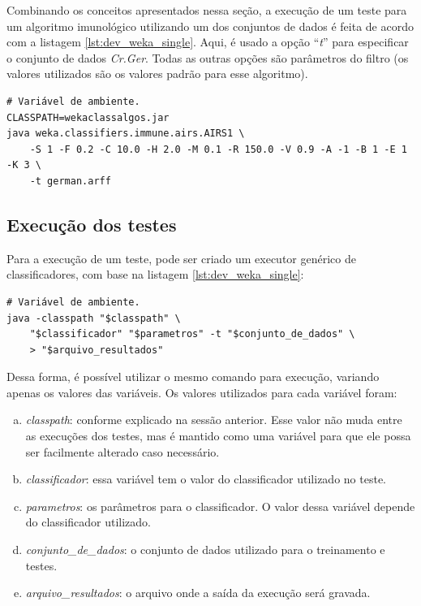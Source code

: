 Combinando os conceitos apresentados nessa seção, a execução de um teste para um algoritmo imunológico utilizando um dos conjuntos de dados é feita de acordo com a listagem \ref{lst:dev_weka_single}. Aqui, é usado a opção ``\emph{t}'' para especificar o conjunto de dados \emph{Cr.Ger}. Todas as outras opções são parâmetros do filtro (os valores utilizados são os valores padrão para esse algoritmo).

\vspace{0.5cm}
\begin{lstlisting}[caption=Execução de um algoritmo do pacote de algoritmos imunológicos utilizando um dos conjuntos de dados, label=lst:dev_weka_single]
# Variável de ambiente.
CLASSPATH=wekaclassalgos.jar
java weka.classifiers.immune.airs.AIRS1 \
    -S 1 -F 0.2 -C 10.0 -H 2.0 -M 0.1 -R 150.0 -V 0.9 -A -1 -B 1 -E 1 -K 3 \
    -t german.arff
\end{lstlisting}
\vspace{0.5cm}

\subsection{Execução dos testes}

Para a execução de um teste, pode ser criado um executor genérico de classificadores, com base na listagem \ref{lst:dev_weka_single}:

\vspace{0.5cm}
\begin{lstlisting}[caption=Execução genérica de um teste, label=lst:dev_weka_template]
# Variável de ambiente.
java -classpath "$classpath" \
    "$classificador" "$parametros" -t "$conjunto_de_dados" \
    > "$arquivo_resultados"
\end{lstlisting}
\vspace{0.5cm}

Dessa forma, é possível utilizar o mesmo comando para execução, variando apenas os valores das variáveis. Os valores utilizados para cada variável foram:

\begin{enumerate}[a)]
    \item \emph{classpath}: conforme explicado na sessão anterior. Esse valor não muda entre as execuções dos testes, mas é mantido como uma variável para que ele possa ser facilmente alterado caso necessário.
    \item \emph{classificador}: essa variável tem o valor do classificador utilizado no teste.
    \item \emph{parametros}: os parâmetros para o classificador. O valor dessa variável depende do classificador utilizado.
    \item \emph{conjunto\_de\_dados}: o conjunto de dados utilizado para o treinamento e testes.
    \item \emph{arquivo\_resultados}: o arquivo onde a saída da execução será gravada.
\end{enumerate}

